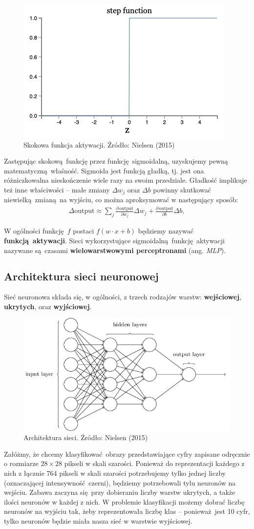 \documentclass[10pt, oneside]{article}
\theoremstyle{remark}
\begin{document}
\begin{figure}[htpb]
	\centering
	\includegraphics[width=.4\linewidth]{figures/step}
	\caption{Skokowa funkcja aktywacji. Źródło: Nielsen (2015)}
	\label{fig:step}
\end{figure}

Zastępując skokową funkcję przez funkcję sigmoidalną, uzyskujemy pewną matematyczną właśność.
Sigmoida jest funkcją gładką, tj. jest ona różniczkowalna nieskończenie wiele razy na swoim przedziale.
Gładkość implikuje też inne właściwości -- małe zmiany $\Delta w_j$ oraz $\Delta b$ powinny skutkować niewielką zmianą na wyjściu, co można aproksymować w następujący sposób:
\begin{eqnarray} 
  \Delta \mbox{output} \approx \sum_j \frac{\partial \, \mbox{output}}{\partial w_j}
  \Delta w_j + \frac{\partial \, \mbox{output}}{\partial b} \Delta b,
\end{eqnarray}

W ogólności funkcję $f$ postaci $f(w \cdot x + b)$ będziemy nazywać \textbf{funkcją aktywacji}.
Sieci wykorzystujące sigmoidalną funkcję aktywacji nazywane są czasami \textbf{wielowarstwowymi perceptronami} (ang. \emph{MLP}).



\subsection{Architektura sieci neuronowej}
Sieć neuronowa składa się, w ogólności, z trzech rodzajów warstw: \textbf{wejściowej}, \textbf{ukrytych}, oraz \textbf{wyjściowej}.
\begin{figure}[htpb]
	\centering
	\includegraphics[width=.5\linewidth]{figures/tikz11}
	\caption{Architektura sieci. Źródło: Nielsen (2015)}
\end{figure}
Załóżmy, że chcemy klasyfikować obrazy przedstawiające cyfry zapisane odręcznie o rozmiarze $28 \times 28$ pikseli w skali szarości.
Ponieważ do reprezentacji każdego z nich z łącznie 764 pikseli w skali szarości potrzebujemy tylko jednej liczby (oznaczającej intensywność czerni), będziemy potrzebowali tylu neuronów na wejściu.
Zabawa zaczyna się przy dobieraniu liczby warstw ukrytych, a także ilości neuronów w każdej z nich.
W problemie klasyfikacji możemy dobrać liczbę neuronów na wyjściu tak, żeby reprezentowała liczbę klas -- ponieważ jest 10 cyfr, tylko neuronów będzie miała nasza sieć w warstwie wyjściowej.
\end{document}
